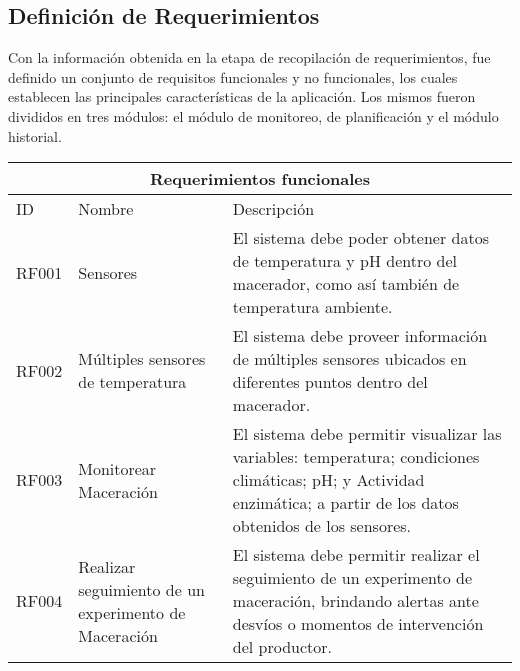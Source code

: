    \subsection{Definición de Requerimientos}
    \begin{minipage}{0.95\textwidth}
    \par
    Con la información obtenida en la etapa de recopilación de requerimientos, fue definido un conjunto de requisitos funcionales y no funcionales, los cuales establecen las principales características de la aplicación. Los mismos fueron divididos en tres módulos: el módulo de monitoreo, de planificación y el módulo historial.
    \end{minipage}
    
  \begin{minipage}{0.95\textwidth}
   \begin{center}
   \begin{tabularx}{\textwidth}{| X | X | X |}
   \hline
   \multicolumn{3}{|c|}{\textbf{Requerimientos funcionales}} \\
   \hline
    ID & Nombre & Descripción \\
   \hline
   \hline
        RF001 & Sensores & El sistema debe poder obtener datos de temperatura y pH dentro del macerador, como así también de temperatura ambiente.
        \\\hline
        RF002 & Múltiples sensores de temperatura  & El sistema debe proveer información de múltiples sensores ubicados en diferentes puntos dentro del macerador.
        \\\hline
        RF003 & Monitorear Maceración & El sistema debe permitir visualizar las variables: temperatura; condiciones climáticas; pH; y Actividad enzimática; a partir de los datos obtenidos de los sensores.
        \\\hline
        RF004 & Realizar seguimiento de un experimento de Maceración & El sistema debe permitir realizar el seguimiento de un experimento de maceración, brindando alertas ante desvíos o momentos de intervención del productor. \\\hline
        
    \end{tabularx}
    \label{ReqFuncionales_Parte1}
    \end{center}
    \end{minipage}
    
